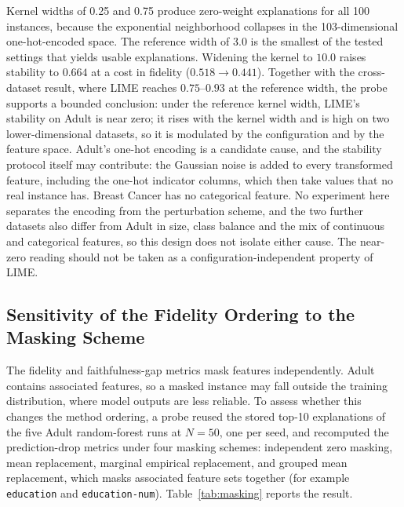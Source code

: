\documentclass[11pt,a4paper]{article}
\begin{document}
Kernel widths of 0.25 and 0.75 produce zero-weight explanations for all 100
instances, because the exponential neighborhood collapses in the
103-dimensional one-hot-encoded space. The reference width of 3.0 is the
smallest of the tested settings that yields usable explanations. Widening
the kernel to $10.0$ raises stability to $0.664$ at a cost in fidelity
($0.518 \rightarrow 0.441$). Together with the cross-dataset result, where
LIME reaches $0.75$--$0.93$ at the reference width, the probe supports a
bounded conclusion: under the reference kernel width, LIME's stability on
Adult is near zero; it rises with the kernel width and is high on two
lower-dimensional datasets, so it is modulated by the configuration and by
the feature space. Adult's one-hot encoding is a candidate cause, and the
stability protocol itself may contribute: the Gaussian noise is added to
every transformed feature, including the one-hot indicator columns, which
then take values that no real instance has. Breast Cancer has no
categorical feature. No experiment here separates the encoding from the
perturbation scheme, and the two further datasets also differ from Adult in
size, class balance and the mix of continuous and categorical features, so
this design does not isolate either cause. The near-zero reading should not be taken as a
configuration-independent property of LIME.

\subsection{Sensitivity of the Fidelity Ordering to the Masking Scheme}
\label{sec:masking}

The fidelity and faithfulness-gap metrics mask features independently.
Adult contains associated features, so a masked instance may fall outside
the training distribution, where model outputs are less reliable. To assess
whether this changes the method ordering, a probe reused the stored top-10
explanations of the five Adult random-forest runs at $N=50$, one per seed,
and recomputed the prediction-drop metrics under four masking schemes:
independent zero masking, mean replacement, marginal empirical replacement,
and grouped mean replacement, which masks associated feature sets together
(for example \texttt{education} and \texttt{education-num}).
Table~\ref{tab:masking} reports the result.
\end{document}
